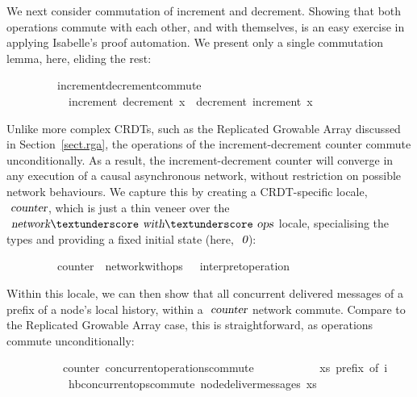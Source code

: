 We next consider commutation of increment and decrement.
Showing that both operations commute with each other, and with themselves, is an easy exercise in applying Isabelle's proof automation.
We present only a single commutation lemma, here, eliding the rest:
\vspace{0.375em}
\begin{isabellebody}
\ \ \ \ \ \ \ \ \ increment{\isacharunderscore}decrement{\isacharunderscore}commute{\isacharcolon}\isanewline
\ \ \ \ \ \ \ \ \ \ \ {\isachardoublequoteopen}increment\ {\isacharparenleft}decrement\ x{\isacharparenright}\ {\isacharequal}\ decrement\ {\isacharparenleft}increment\ x{\isacharparenright}{\isachardoublequoteclose}\isanewline
\end{isabellebody}
\vspace{0.375em}
Unlike more complex CRDTs, such as the Replicated Growable Array discussed in Section~\ref{sect.rga}, the operations of the increment-decrement counter commute unconditionally.
As a result, the increment-decrement counter will converge in any execution of a causal asynchronous network, without restriction on possible network behaviours.
We capture this by creating a CRDT-specific locale, $\isa{counter}$, which is just a thin veneer over the $\isa{network}{\isacharunderscore}\isa{with}{\isacharunderscore}\isa{ops}$ locale, specialising the types and providing a fixed initial state (here, $\isa{0}$):
\vspace{0.375em}
\begin{isabellebody}
\ \ \ \ \ \ \ \ \ counter\ {\isacharequal}\ network{\isacharunderscore}with{\isacharunderscore}ops\ {\isacharunderscore}\ {\isacharunderscore}\ interpret{\isacharunderscore}operation\ {}\isanewline
\end{isabellebody}
\vspace{0.375em}
Within this locale, we can then show that all concurrent delivered messages of a prefix of a node's local history, within a $\isa{counter}$ network commute.
Compare to the Replicated Growable Array case, this is straightforward, as operations commute unconditionally:
\vspace{0.375em}
\begin{isabellebody}
\ \ \ \ \ \ \ \ \ {\isacharparenleft}\ counter{\isacharparenright}\ concurrent{\isacharunderscore}operations{\isacharunderscore}commute{\isacharcolon}\isanewline
\ \ \ \ \ \ \ \ \ \ \ {\isachardoublequoteopen}xs\ prefix\ of\ i{\isachardoublequoteclose}\isanewline
\ \ \ \ \ \ \ \ \ \ \ {\isachardoublequoteopen}hb{\isachardot}concurrent{\isacharunderscore}ops{\isacharunderscore}commute\ {\isacharparenleft}node{\isacharunderscore}deliver{\isacharunderscore}messages\ xs{\isacharparenright}{\isachardoublequoteclose}\isanewline
\end{isabellebody}
